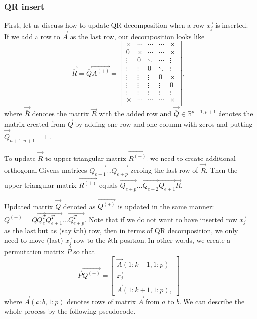 \subsubsection*{QR insert} 
First, let us discuss how to update QR decomposition when a row $\vec{x_j}$ is inserted. 
If we add a row to $\vec{A}$ as the last row, our decomposition looks like
\begin{equation}
    \vec{\overline{R}} =  \vec{\overline{Q}} \vec{A^{(+)}}  = 
    \begin{bmatrix}
        \times & \cdots & \cdots & \cdots & \times \\
        0 &\times & \cdots & \cdots & \times \\
        \vdots& 0&\ddots & \cdots & \vdots \\
        \vdots& \vdots&0 & \ddots &  \vdots \\
        \vdots& \vdots& \vdots& 0& \times \\
        \vdots& \vdots& \vdots& \vdots& 0  \\
        \vdots& \vdots& \vdots& \vdots& \vdots \\
        \times & \cdots & \cdots & \cdots & \times \\
    \end{bmatrix},
\end{equation}
where $\vec{\overline{R}}$ denotes the matrix $\vec{R}$ with the added row and $\vec{\overline{Q}} \in \mathbb{R}^{p+1, p+1}$ denotes the matrix created from $\vec{Q}$ by adding one row and one column with zeros and putting $\vec{\overline{Q}}_{n+1,n+1} = 1$ . 

To update $\vec{\overline{R}}$ to upper triangular matrix $\vec{R^{(+)}}$, we need to create additional orthogonal Givens matrices $\vec{Q_{e+1}}\ldots\vec{Q_{e+p}}$ zeroing the last row of  $\vec{\overline{R}}$. Then the upper triangular matrix $\vec{R^{(+)}}$ equals $ \vec{Q_{e+p}} \ldots \vec{Q_{e+2}} \vec{Q_{e+1}} \vec{R}$. 

Updated matrix $\vec{\overline{Q}}$ denoted as $\vec{Q^{(+)}}$
is updated in the same manner: $\vec{Q^{(+)}} = \vec{Q}\vec{Q_e^T}\vec{Q_{e+1}^T}\ldots\vec{Q_{e+p}^T}$.
Note that if we do not want to have inserted row $\vec{x_j}$ as the last but as (say $k$th) row, then in terms of QR decomposition, we only need to move (last) $\vec{x_j}$ row to the $k$th position. In other words, we create a permutation  matrix $\vec{P}$ so that 
\begin{equation}
    \vec{P}\vec{Q^{(+)}} = \begin{bmatrix}
        \vec{A}(1:k-1 , 1:p) \\
        \vec{x_j} \\
        \vec{A}(1:k+1 , 1:p), 
    \end{bmatrix}
\end{equation} 
where $\vec{A}(a:b , 1:p) $ denotes rows of matrix $\vec{A}$ from $a$ to $b$.
We can describe the whole process by the following pseudocode. 



